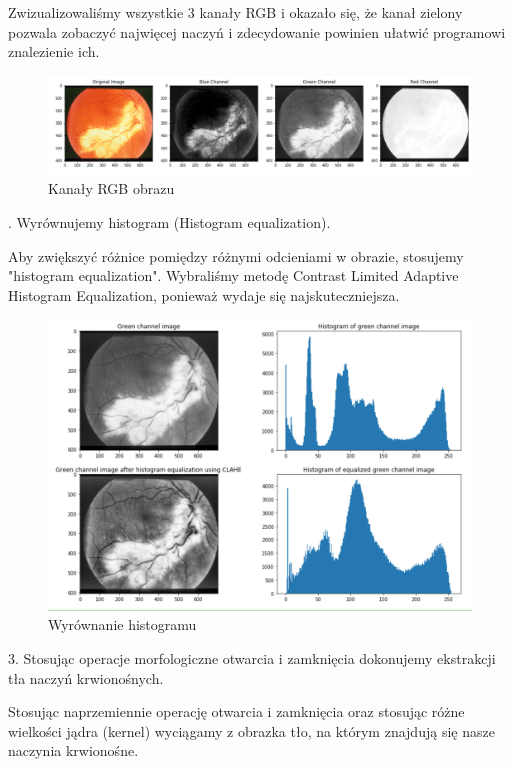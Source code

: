 \documentclass[11pt]{article}
\begin{document}
Zwizualizowaliśmy wszystkie 3 kanały RGB i okazało się, że kanał zielony pozwala zobaczyć najwięcej naczyń i zdecydowanie powinien ułatwić programowi znalezienie ich.

\begin{figure}[h]
    \centering
	\includegraphics[scale=0.4]{res/img_pro_1.png}
	\caption{Kanały RGB obrazu}
	\label{fig:demo}
\end{figure}
. Wyrównujemy histogram (Histogram equalization).

Aby zwiększyć różnice pomiędzy różnymi odcieniami w obrazie, stosujemy "histogram equalization". Wybraliśmy metodę Contrast Limited Adaptive Histogram Equalization, ponieważ wydaje się najskuteczniejsza.

\begin{figure}[h]
    \centering
	\includegraphics[scale=0.3]{res/img_pro_2.png}
	\caption{Wyrównanie histogramu}
	\label{fig:demo}
\end{figure}

3. Stosując operacje morfologiczne otwarcia i zamknięcia dokonujemy ekstrakcji tła naczyń krwionośnych. 

Stosując naprzemiennie operację otwarcia i zamknięcia oraz stosując różne wielkości jądra (kernel) wyciągamy z obrazka tło, na którym znajdują się nasze naczynia krwionośne.
\end{document}
